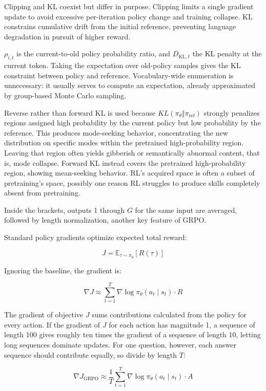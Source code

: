 Clipping and KL coexist but differ in purpose. Clipping limits a single gradient update to avoid excessive per-iteration policy change and training collapse. KL constrains cumulative drift from the initial reference, preventing language degradation in pursuit of higher reward.

\(\rho_{i,t}\) is the current-to-old policy probability ratio, and \(D_{\mathrm{KL},t}\) the KL penalty at the current token. Taking the expectation over old-policy samples gives the KL constraint between policy and reference. Vocabulary-wide enumeration is unnecessary: it usually serves to compute an expectation, already approximated by group-based Monte Carlo sampling.

Reverse rather than forward KL is used because \(KL(\pi_{\theta}\Vert\pi_{\mathrm{ref}})\) strongly penalizes regions assigned high probability by the current policy but low probability by the reference. This produces mode-seeking behavior, concentrating the new distribution on specific modes within the pretrained high-probability region. Leaving that region often yields gibberish or semantically abnormal content, that is, mode collapse. Forward KL instead covers the pretrained high-probability region, showing mean-seeking behavior. RL's acquired space is often a subset of pretraining's space, possibly one reason RL struggles to produce skills completely absent from pretraining.

Inside the brackets, outputs 1 through \(G\) for the same input are averaged, followed by length normalization, another key feature of GRPO.

Standard policy gradients optimize expected total reward:

\[
J=\mathbb{E}_{\tau\sim\pi_{\theta}}[R(\tau)]
\]

Ignoring the baseline, the gradient is:

\[
\nabla J\approx \sum_{t=1}^{T}\nabla\log\pi_{\theta}(a_t\mid s_t)\cdot R
\]

The gradient of objective \(J\) sums contributions calculated from the policy for every action. If the gradient of \(J\) for each action has magnitude 1, a sequence of length 100 gives roughly ten times the gradient of a sequence of length 10, letting long sequences dominate updates. For one question, however, each answer sequence should contribute equally, so divide by length \(T\):

\[
\nabla J_{\mathrm{GRPO}}\approx \frac{1}{T}\sum_{t=1}^{T}\nabla\log\pi_{\theta}(a_t\mid s_t)\cdot A
\]


